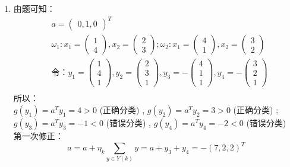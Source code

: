 \documentclass[a4paper,11pt,onecolumn,oneside,UTF8]{article}
\begin{document}
\begin{enumerate}
    \item 由题可知：
          $$
              \begin{aligned}
                   & a = \begin{pmatrix} 0,1,0 \end{pmatrix}^T                                                                                                                       \\
                   & \omega_1:x_1 = \begin{pmatrix} 1\\4 \end{pmatrix}, x_2 = \begin{pmatrix} 2\\3 \end{pmatrix}; \omega_2:x_1 = \begin{pmatrix} 4\\1 \end{pmatrix}, x_2 = \begin{pmatrix} 3\\2 \end{pmatrix} \\
                   & 令：y_1 = \begin{pmatrix} 1\\4\\1 \end{pmatrix}, y_2 = \begin{pmatrix} 2\\3\\1 \end{pmatrix}, y_3 = -\begin{pmatrix} 4\\1\\1 \end{pmatrix}, y_4 = -\begin{pmatrix} 3\\2\\1 \end{pmatrix}          \\
              \end{aligned}
          $$
          所以：\\
          $g(y_1) = a^Ty_1 = 4 > 0$ (正确分类) , $g(y_2) = a^Ty_2 = 3 > 0$ (正确分类) ; \\
          $g(y_3) = a^Ty_3 = -1 < 0$ (错误分类) , $g(y_4) = a^Ty_4 = -2 < 0$ (错误分类) \\
          第一次修正：
          $$
              a = a + \eta_k \sum_{y\in Y(k)}y = a + y_3 + y_4 = -\left(7,2,2\right)^T
$$
\end{enumerate}
\end{document}
